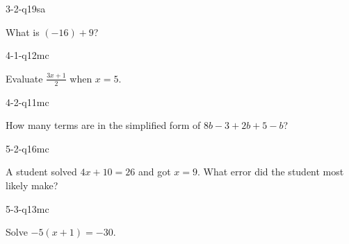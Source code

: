 \begin{practiceQuestion}{3-2-q19}{sa}
\begin{questionText}
What is $(-16) + 9$?
\end{questionText}
\end{practiceQuestion}

\begin{practiceQuestion}{4-1-q12}{mc}
\begin{questionText}
Evaluate $\frac{3x + 1}{2}$ when $x = 5$.
\end{questionText}
\end{practiceQuestion}

\begin{practiceQuestion}{4-2-q11}{mc}
\begin{questionText}
How many terms are in the simplified form of $8b - 3 + 2b + 5 - b$?
\end{questionText}
\end{practiceQuestion}

\begin{practiceQuestion}{5-2-q16}{mc}
\begin{questionText}
A student solved $4x + 10 = 26$ and got $x = 9$. What error did the student most likely make?
\end{questionText}
\end{practiceQuestion}

\begin{practiceQuestion}{5-3-q13}{mc}
\begin{questionText}
Solve $-5(x + 1) = -30$.
\end{questionText}
\end{practiceQuestion}

